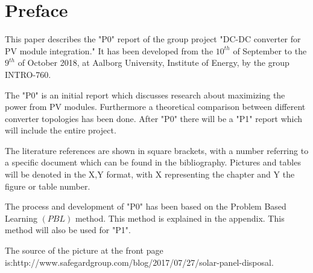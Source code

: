 \chapter*{Preface}

This paper describes the "P0" report of the group project "DC-DC converter for PV module integration." It has been developed from the $10^{th}$ of September to the $9^{th}$ of October 2018, at Aalborg University, Institute of Energy, by the group INTRO-760.

The "P0" is an initial report which discusses research about maximizing the power from PV modules.
Furthermore a theoretical comparison between different converter topologies has been done. After "P0" there will be a "P1" report which will include the entire project.

The literature references are shown in square brackets, with a number referring to a specific document which can be found in the bibliography. Pictures and tables will be denoted in the X,Y format, with X representing the chapter and Y the figure or table number. 

The process and development of "P0" has been based on the Problem Based Learning $(PBL)$ method. This method is explained in the appendix. This method will also be used for "P1".

The source of the picture at the front page is:\newline http://www.safegardgroup.com/blog/2017/07/27/solar-panel-disposal\cite{frontpage_pic}.
